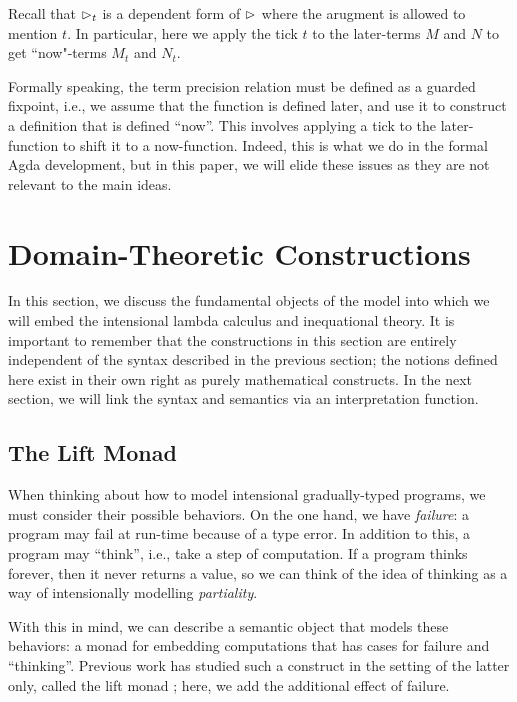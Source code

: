 \documentclass[acmsmall,screen]{acmart}
\begin{document}
Recall that $\vartriangleright_t$ is a dependent form of $\vartriangleright$ where the arugment is allowed
to mention $t$. In particular, here we apply the tick $t$ to the later-terms $M$ and $N$ to get 
``now"-terms $M_t$ and $N_t$.

Formally speaking, the term precision relation must be defined as a guarded fixpoint,
i.e., we assume that the function is defined later, and use it to construct a definition
that is defined ``now''. This involves applying a tick to the later-function to shift it
to a now-function. Indeed, this is what we do in the formal Agda development, but in this
paper, we will elide these issues as they are not relevant to the main ideas.





\section{Domain-Theoretic Constructions}\label{sec:domain-theory}

In this section, we discuss the fundamental objects of the model into which we will embed
the intensional lambda calculus and inequational theory. It is important to remember that
the constructions in this section are entirely independent of the syntax described in the
previous section; the notions defined here exist in their own right as purely mathematical
constructs. In the next section, we will link the syntax and semantics via an interpretation
function.

\subsection{The Lift Monad}

When thinking about how to model intensional gradually-typed programs, we must consider
their possible behaviors. On the one hand, we have \emph{failure}: a program may fail
at run-time because of a type error. In addition to this, a program may ``think'',
i.e., take a step of computation. If a program thinks forever, then it never returns a value,
so we can think of the idea of thinking as a way of intensionally modelling \emph{partiality}.

With this in mind, we can describe a semantic object that models these behaviors: a monad
for embedding computations that has cases for failure and ``thinking''.
Previous work has studied such a construct in the setting of the latter only, called the lift
monad \cite{TODO}; here, we add the additional effect of failure.
\end{document}
